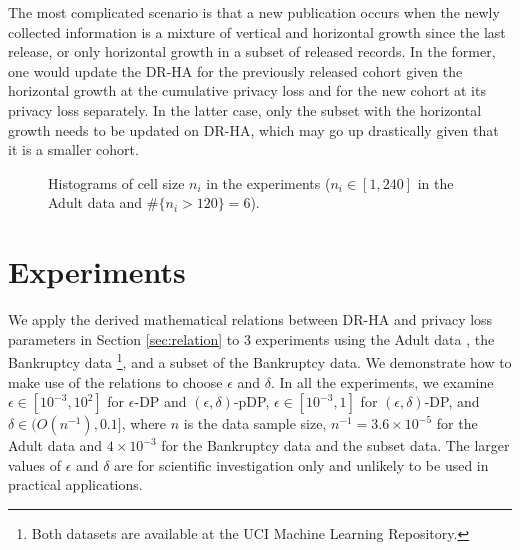 \documentclass[10pt,journal,compsoc]{IEEEtran}
\begin{document}
The most complicated scenario is that a new publication occurs when the newly collected information is a mixture of vertical and horizontal growth since the last release, or only horizontal growth in a subset of released records. In the former, one would update the DR-HA for the previously released cohort given the horizontal growth at the cumulative privacy loss and for the new cohort at its privacy loss separately. In the latter case, only the subset with the horizontal growth needs to be updated on DR-HA, which may go up drastically  given that it is a smaller cohort. 
\begin{figure*}[!tb]
\vspace{-15pt}\centering
{}
\vspace{-6pt}
\caption{Histograms of cell size $n_i$ in the experiments ($n_i\in[1, 240]$ in the Adult data and $\#\{n_i>120\}=6$).} \label{fig:hist}\vspace{-12pt}
\end{figure*}



\normalsize\vspace{-9pt}
\section{Experiments} \label{sec:experiment}\vspace{-3pt}
We apply the derived mathematical relations between DR-HA and privacy loss parameters  in Section \ref{sec:relation} to 3 experiments using the Adult data \citep{Adult1996},  the Bankruptcy data \citep{Bankruptcy2014}\footnote{Both datasets are  available at the UCI Machine Learning Repository.}, and a subset of the Bankruptcy data.  We demonstrate how to make use of the relations to choose $\epsilon$ and $\delta$. In all the experiments, we examine $\epsilon\in[10^{-3},10^2]$ for $\epsilon$-DP and $(\epsilon,\delta)$-pDP, $\epsilon\in[10^{-3},1]$ for $(\epsilon,\delta)$-DP, and $\delta\in(O(n^{-1}), 0.1]$, where  $n$ is the data sample size, $n^{-1}=3.6\times 10^{-5}$ for the Adult data and $4\times 10^{-3}$ for the Bankruptcy data and the subset data. The larger values of $\epsilon$ and $\delta$ are for scientific investigation only and unlikely to be used in practical applications.
\end{document}
